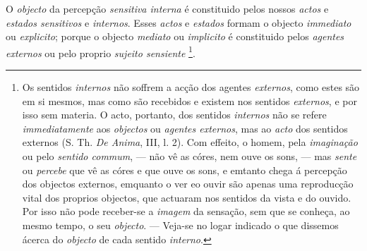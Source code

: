 O \emph{objecto} da percepção \emph{sensitiva interna} é constituido pelos nossos \emph{actos} e \emph{estados sensitivos} e \emph{internos}. Esses \emph{actos} e \emph{estados} formam o objecto \emph{immediato} ou \emph{explicito}; porque o objecto \emph{mediato} ou \emph{implicito} é constituido pelos \emph{agentes externos} ou pelo proprio \emph{sujeito sensiente} \footnote{Os sentidos \emph{internos} não soffrem a acção dos agentes \emph{externos}, como estes são em si mesmos, mas como são recebidos e existem nos sentidos \emph{externos}, e por isso sem materia. O acto, portanto, dos sentidos \emph{internos} não se refere \emph{immediatamente} aos \emph{objectos} ou \emph{agentes externos}, mas ao \emph{acto} dos sentidos externos (S. Th. \emph{De Anima}, III, l. 2). Com effeito, o homem, pela \emph{imaginação} ou pelo \emph{sentido commum}, --- não vê as córes, nem ouve os sons, --- mas \emph{sente} ou \emph{percebe} que vê as córes e que ouve os sons, e emtanto chega á percepção dos objectos externos, emquanto o ver eo ouvir são apenas uma reproducção vital dos proprios objectos, que actuaram nos sentidos da vista e do ouvido. Por isso não pode receber-se a \emph{imagem} da sensação, sem que se conheça, ao mesmo tempo, o seu \emph{objecto}. --- Veja-se no logar indicado o que dissemos ácerca do \emph{objecto} de cada sentido \emph{interno}.}.


